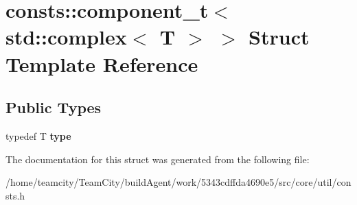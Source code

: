 \hypertarget{structconsts_1_1component__t_3_01std_1_1complex_3_01T_01_4_01_4}{}\section{consts\+:\+:component\+\_\+t$<$ std\+:\+:complex$<$ T $>$ $>$ Struct Template Reference}
\label{structconsts_1_1component__t_3_01std_1_1complex_3_01T_01_4_01_4}
\subsection*{Public Types}
\begin{DoxyCompactItemize}
\item 
typedef T {\bfseries type}\hypertarget{structconsts_1_1component__t_3_01std_1_1complex_3_01T_01_4_01_4_acd8a85832d750cfcabf03a56fecdff9f}{}\label{structconsts_1_1component__t_3_01std_1_1complex_3_01T_01_4_01_4_acd8a85832d750cfcabf03a56fecdff9f}

\end{DoxyCompactItemize}


The documentation for this struct was generated from the following file\+:\begin{DoxyCompactItemize}
\item 
/home/teamcity/\+Team\+City/build\+Agent/work/5343cdffda4690e5/src/core/util/consts.\+h\end{DoxyCompactItemize}
